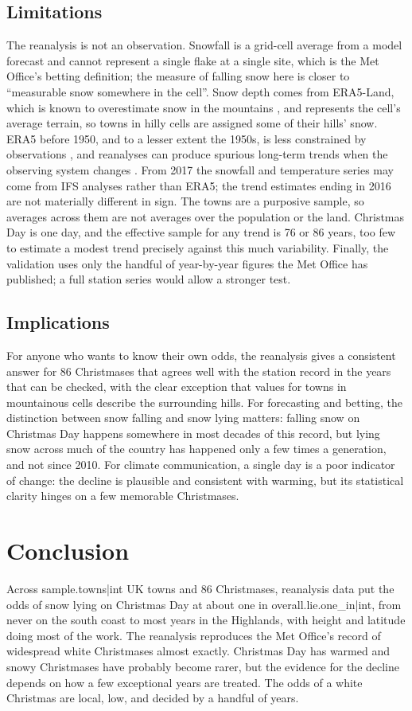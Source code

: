\documentclass[11pt,a4paper]{article}
\begin{document}
\subsection{Limitations}
The reanalysis is not an observation. Snowfall is a grid-cell average from a model forecast and cannot represent a single flake at a single site, which is the Met Office's betting definition; the measure of falling snow here is closer to ``measurable snow somewhere in the cell''. Snow depth comes from ERA5-Land, which is known to overestimate snow in the mountains \citep{kouki2023,monteiro2023}, and represents the cell's average terrain, so towns in hilly cells are assigned some of their hills' snow. ERA5 before 1950, and to a lesser extent the 1950s, is less constrained by observations \citep{bell2021}, and reanalyses can produce spurious long-term trends when the observing system changes \citep{monteiro2023}. From 2017 the snowfall and temperature series may come from IFS analyses rather than ERA5; the trend estimates ending in 2016 are not materially different in sign. The towns are a purposive sample, so averages across them are not averages over the population or the land. Christmas Day is one day, and the effective sample for any trend is 76 or 86 years, too few to estimate a modest trend precisely against this much variability. Finally, the validation uses only the handful of year-by-year figures the Met Office has published; a full station series would allow a stronger test.

\subsection{Implications}
For anyone who wants to know their own odds, the reanalysis gives a consistent answer for 86 Christmases that agrees well with the station record in the years that can be checked, with the clear exception that values for towns in mountainous cells describe the surrounding hills. For forecasting and betting, the distinction between snow falling and snow lying matters: falling snow on Christmas Day happens somewhere in most decades of this record, but lying snow across much of the country has happened only a few times a generation, and not since 2010. For climate communication, a single day is a poor indicator of change: the decline is plausible and consistent with warming, but its statistical clarity hinges on a few memorable Christmases.

\section{Conclusion}\label{sec:conc}
Across {{sample.towns|int}} UK towns and 86 Christmases, reanalysis data put the odds of snow lying on Christmas Day at about one in {{overall.lie.one_in|int}}, from never on the south coast to most years in the Highlands, with height and latitude doing most of the work. The reanalysis reproduces the Met Office's record of widespread white Christmases almost exactly. Christmas Day has warmed and snowy Christmases have probably become rarer, but the evidence for the decline depends on how a few exceptional years are treated. The odds of a white Christmas are local, low, and decided by a handful of years.
\end{document}
